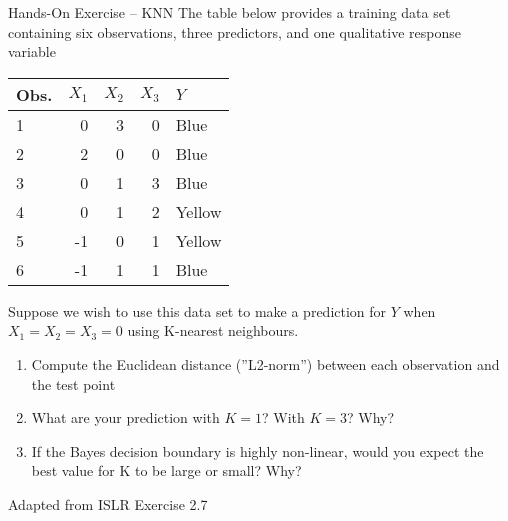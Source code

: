\documentclass[ignorenonframetext,xcolor=x11names]{beamer}
\begin{document}
\begin{frame}{Hands-On Exercise -- KNN}
\small
The table below provides a training data set containing six observations, three predictors, and one qualitative response variable

\begin{center}
\footnotesize
\begin{tabular}{l|r|r|r|l} \hline
Obs. & $X_1$ & $X_2$ & $X_3$ & $Y$ \\ \hline
1 & 0 & 3 & 0 & Blue \\
2 & 2 & 0 & 0 & Blue \\
3 & 0 & 1 & 3 & Blue \\
4 & 0 & 1 & 2 & Yellow \\
5 & -1 & 0 & 1 & Yellow \\
6 & -1 & 1 & 1 & Blue \\ \hline
\end{tabular}
\end{center}

Suppose we wish to use this data set to make a prediction for $Y$ when $X_1=X_2=X_3=0$ using K-nearest neighbours.

\begin{enumerate}
  \item Compute the Euclidean distance (''L2-norm'') between each observation and the test point
  \item What are your prediction with $K=1$? With $K=3$? Why?
  \item If the Bayes decision boundary is highly non-linear, would you expect the best value for K to be large or small? Why?
\end{enumerate}

\scriptsize Adapted from ISLR Exercise 2.7
\end{frame}
\end{document}
